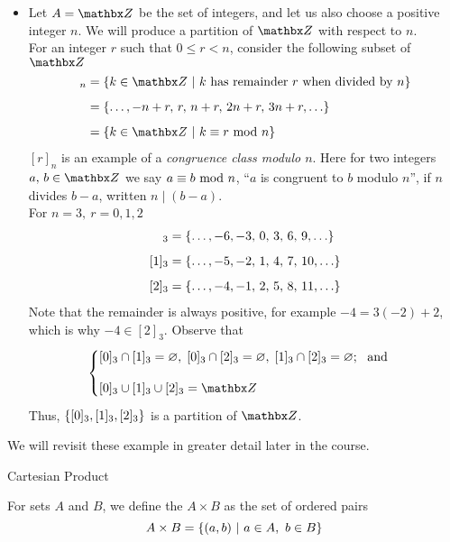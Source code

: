 \begin{example}
\begin{itemize}[itemsep=1em]
\item Let $A = \zz$ be the set of integers, and let us also choose a positive integer $n$. We will produce a partition of $\zz$ with respect to $n$.\\[0.5em]
For an integer $r$ such that $0 \leq r < n$, consider the following subset of $\zz$
\begin{align*}
[r]_n &= \setp{k \in \zz}{\text{$k$ has remainder $r$ when divided by $n$}}\\[0.5em]
 &= \set{\ldots,-n + r,\,r,\,n + r,\,2n + r,\,3n + r,\ldots}\\[0.5em]
 &= \setp{k \in \zz}{k\equiv r \modar{n}}
\end{align*}
$[r]_n$ is an example of a \emph{congruence class modulo $n$}. Here for two integers $a,\,b \in \zz$ we say $a \equiv b \text{ mod }{n}$, ``$a$ is congruent to $b$ modulo $n$'', if $n$ divides $b - a$, written $n \mid (b-a)$.\\[0.5em]
For $n = 3,\ r = 0,1,2$
\begin{align*}
[0]_3 &= \set{\ldots,-6,-3,\,0,\,3,\,6,\,9,\ldots}\\[0.5em]
[1]_3 &= \set{\ldots,-5,-2,\,1,\,4,\,7,\,10,\ldots}\\[0.5em]
[2]_3 &= \set{\ldots,-4,-1,\,2,\,5,\,8,\,11,\ldots}
\end{align*}
Note that the remainder is always positive, for example $-4 = 3(-2) + 2$, which is why $-4 \in [2]_3$. Observe that
\[\begin{cases}
[0]_3 \cap [1]_3 = \emptyset,\;[0]_3 \cap [2]_3 = \emptyset,\;[1]_3 \cap [2]_3 = \emptyset;\ \text{ and}\\[1em]
[0]_3 \cup [1]_3 \cup [2]_3 = \zz\\[0.1em]
\end{cases}\]
Thus, $\left\{[0]_3, [1]_3, [2]_3\right\}$ is a partition of $\zz$.
\end{itemize}
We will revisit these example in greater detail later in the course.
\end{example}

\vspace*{2em}

\begin{mdframed}
\begin{center}
{\Large Cartesian Product}
\end{center}
\end{mdframed}

\begin{definition}
For sets $A$ and $B$, we define the  $A \times B$ as the set of ordered pairs
\[A \times B = \left\{(a,b)\ \vert\ a \in A,\ b \in B\right\}\]
\end{definition}

